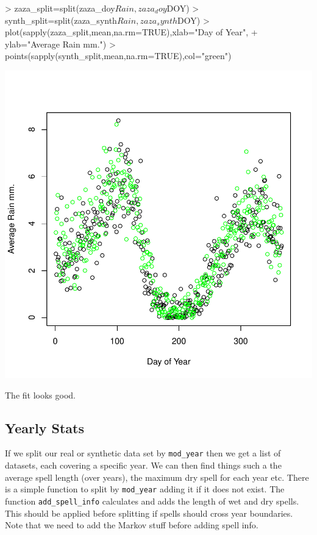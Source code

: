\documentclass{article}
\begin{document}
\begin{Schunk}
\begin{Sinput}
> zaza_split=split(zaza_doy$Rain,zaza_doy$DOY)
> synth_split=split(zaza_synth$Rain,zaza_synth$DOY)
> plot(sapply(zaza_split,mean,na.rm=TRUE),xlab="Day of Year",
+      ylab="Average Rain mm.")
> points(sapply(synth_split,mean,na.rm=TRUE),col="green")
\end{Sinput}
\end{Schunk}
\includegraphics{climate_vignette-018}

The fit looks good.
\subsection{Yearly Stats}

If we split our real or synthetic data set by {\tt mod\_year}
then we get a list of datasets, each covering a specific year. We can then
find things such a the average spell length (over years), the maximum dry spell
for each year etc.  There is a simple function to split by {\tt mod\_year}
adding it if it does not exist.  The function {\tt add\_spell\_info} calculates
and adds the length of wet and dry spells.
This should be applied before splitting if spells should cross year boundaries.
Note that we need to add the Markov stuff before adding spell info.
\end{document}
